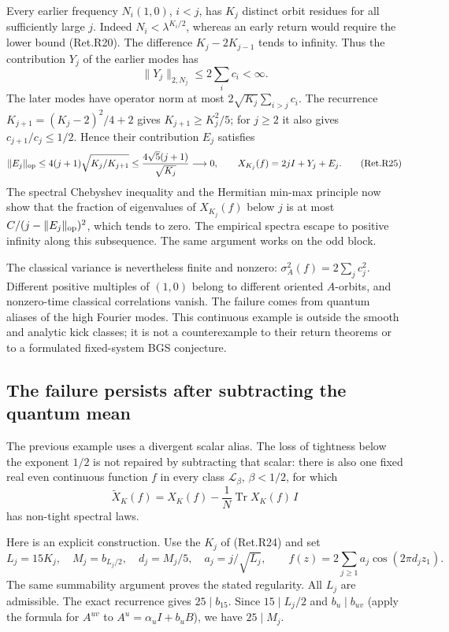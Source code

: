 Every earlier frequency \(N_i(1,0)\), \(i<j\), has \(K_j\) distinct orbit
residues for all sufficiently large \(j\). Indeed \(N_i<\lambda^{K_i/2}\),
whereas an early return would require the lower bound (Ret.R20).
The difference \(K_j-2K_{j-1}\) tends to infinity.
Thus the contribution \(Y_j\) of the earlier modes has
\[
                         \|Y_j\|_{2,N_j}\le2\sum_i c_i<\infty .
\]
The later modes have operator norm at most
\(2\sqrt{K_j}\sum_{i>j}c_i\).
The recurrence \(K_{j+1}=(K_j-2)^2/4+2\) gives
\(K_{j+1}\ge K_j^2/5\); for \(j\ge2\) it also gives
\(c_{j+1}/c_j\le1/2\).
Hence their contribution \(E_j\) satisfies
\[
 \|E_j\|_{\rm op}
       \le4(j+1)\sqrt{K_j/K_{j+1}}
       \le\frac{4\sqrt5(j+1)}{\sqrt{K_j}}\longrightarrow0,
 \qquad X_{K_j}(f)=2jI+Y_j+E_j.                            \tag{Ret.R25}
\]
The spectral Chebyshev inequality and the Hermitian min-max principle
now show that the fraction of eigenvalues of \(X_{K_j}(f)\) below \(j\)
is at most \(C/(j-\|E_j\|_{\rm op})^2\), which tends to zero.
The empirical spectra escape to positive infinity along this subsequence.
The same argument works on the odd block.

The classical variance is nevertheless finite and nonzero:
\(\sigma_A^2(f)=2\sum_jc_j^2\).
Different positive multiples of \((1,0)\) belong to different oriented
\(A\)-orbits, and nonzero-time classical correlations vanish.
The failure comes from quantum aliases of the high Fourier modes.
This continuous example is outside the smooth and analytic kick classes;
it is not a counterexample to their return theorems or to a formulated
fixed-system BGS conjecture.

\hypertarget{the-failure-persists-after-subtracting-the-quantum-mean}{%
\subsection{The failure persists after subtracting the quantum mean}\label{the-failure-persists-after-subtracting-the-quantum-mean}}

The previous example uses a divergent scalar alias. The loss of tightness
below the exponent \(1/2\) is not repaired by subtracting that scalar:
there is also one fixed real even continuous function \(f\) in every
class \(\mathcal L_\beta\), \(\beta<1/2\), for which
\[
 \widetilde X_K(f)=X_K(f)-\frac1N\operatorname{Tr}X_K(f)\,I
                                                               \tag{Ret.R26}
\]
has non-tight spectral laws.

Here is an explicit construction. Use the \(K_j\) of (Ret.R24) and set
\[
 L_j=15K_j,\quad M_j=b_{L_j/2},\quad d_j=M_j/5,\quad
 a_j=j/\sqrt{L_j},\qquad
 f(z)=2\sum_{j\ge1}a_j\cos(2\pi d_jz_1).                    \tag{Ret.R27}
\]
The same summability argument proves the stated regularity.
All \(L_j\) are admissible. The exact recurrence gives \(25\mid b_{15}\).
Since \(15\mid L_j/2\) and \(b_u\mid b_{uv}\) (apply the formula for
\(A^{uv}\) to \(A^u=\alpha_uI+b_uB\)), we have \(25\mid M_j\).

